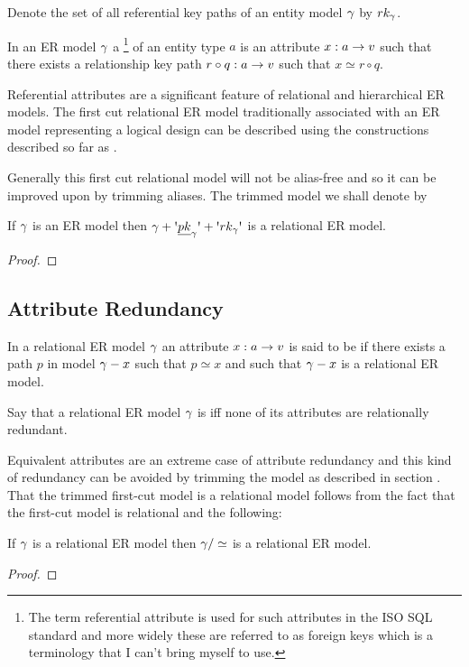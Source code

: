 Denote the set of all referential key paths of an entity model $\gamma$ by $rk_{\gamma}$.

\begin{definition}
In an ER model $\gamma$ a \footnote{The term referential attribute is used 
for such attributes in the ISO SQL standard and  more widely these are referred to as foreign keys which is a terminology that I can't bring myself to use.} of an entity type $a$ is an attribute
$x:a \rightarrow v$ such that there exists a relationship key path $r \circ q: a \rightarrow v$
such that $x \simeq r \circ q$. 
\end{definition}

Referential attributes are a significant feature of relational and hierarchical ER models.
The first cut relational ER model traditionally associated with an ER model representing 
a logical design can be described using the constructions described so far as
\highlight{$\firstcutmodel$}. 

Generally  this first cut relational model will not be alias-free and so it can be improved upon by trimming aliases. The trimmed model we shall denote by 
\highlight{$\trimmedfirstcutmodel$} 
\begin{lemma}
If $\gamma$ is an ER model then $\firstcutmodel$ is a relational ER model.
\end{lemma}
\begin{proof}
\tbd
\end{proof}

\subsection{Attribute Redundancy}
\begin{definition}
In a relational ER model $\gamma$ an attribute $x: a \rightarrow v$ is said to be  if
there exists a path $p$ in model $\gamma - x$ such that $p \simeq x$ and such that $\gamma - x$ is 
a relational ER model.  
\end{definition}
\begin{definition}
Say that a relational ER model $\gamma$ is  iff none of its attributes are relationally redundant.
\end{definition}

Equivalent attributes are an extreme case of attribute redundancy and this kind of redundancy can be avoided by trimming the model as described in section . That the trimmed first-cut model is a relational model follows from the fact that the first-cut model is relational and the following:
\begin{lemma}
If $\gamma$ is a relational ER model then $\gamma/\simeq$ is a relational ER model.
\end{lemma}
\begin{proof}
\tbd
\end{proof}


